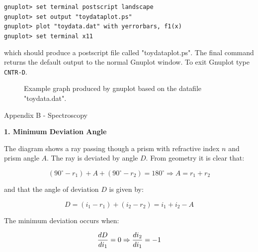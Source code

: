 \documentclass[12pt]{article}
\newcommand{\degree}{^\circ}
\begin{document}
{\tt gnuplot> set terminal postscript landscape}\\
{\tt gnuplot> set output "toydataplot.ps"}\\
{\tt gnuplot> plot "toydata.dat" with yerrorbars, f1(x)}\\
{\tt gnuplot> set terminal x11}

which should produce a postscript file called "toydataplot.ps". The
final command returns the default output to the normal Gnuplot
window. To exit Gnuplot type {\tt CNTR-D}.

\begin{figure}
\centerline{}
\caption{Example graph produced 
by gnuplot based on the datafile "toydata.dat".}
\end{figure}


\newpage
\pagestyle{empty}

\centerline{\hspace{-2cm}  \Huge Appendix B - Spectroscopy}

\begin{center}
{\large {\bf 1. Minimum Deviation Angle}}
\end{center}
\centerline{}

The diagram shows a ray passing though a prism with refractive index $n$ and prism angle $A$. The ray is deviated by angle $D$. From geometry it is clear that:\\
\begin{center}
\begin{equation}
(90 \degree - r_1) + A + (90\degree - r_2)=180\degree 
\Rightarrow A=r_1 + r_2
\end{equation}
\end{center}
and that the angle of deviation $D$ is given by:
\begin{center}
\begin{equation}
D=(i_1 - r_1) + (i_2 - r_2) = i_1 + i_2 - A
\end{equation}
\end{center}
The minimum deviation occurs when:
\begin{center}
\begin{equation}
{\Large
\frac{dD}{d i_1}=0 \Rightarrow \frac{d i_2}{d i_1}=-1
}
\end{equation}
\end{center}
\end{document}
